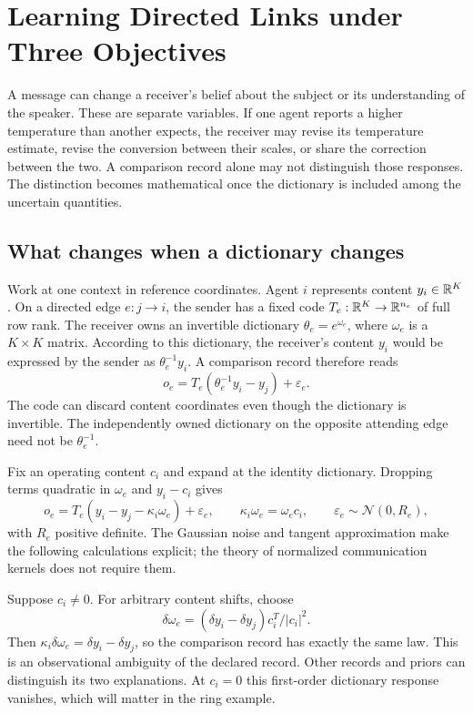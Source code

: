 \chapter{Learning Directed Links under Three Objectives}
\label{c18:link-dynamics}

A message can change a receiver's belief about the subject or its understanding of the speaker. These are separate variables. If one agent reports a higher temperature than another expects, the receiver may revise its temperature estimate, revise the conversion between their scales, or share the correction between the two. A comparison record alone may not distinguish those responses. The distinction becomes mathematical once the dictionary is included among the uncertain quantities.

\section{What changes when a dictionary changes}

Work at one context in reference coordinates. Agent $i$ represents content $y_i\in\mathbb R^K$. On a directed edge $e:j\to i$, the sender has a fixed code $T_e:\mathbb R^K\to\mathbb R^{n_e}$ of full row rank. The receiver owns an invertible dictionary $\theta_e=e^{\omega_e}$, where $\omega_e$ is a $K\times K$ matrix. According to this dictionary, the receiver's content $y_i$ would be expressed by the sender as $\theta_e^{-1}y_i$. A comparison record therefore reads
\begin{equation}
 o_e=T_e(\theta_e^{-1}y_i-y_j)+\varepsilon_e.
 \label{c18:nonlinear-record}
\end{equation}
The code can discard content coordinates even though the dictionary is invertible. The independently owned dictionary on the opposite attending edge need not be $\theta_e^{-1}$.

Fix an operating content $c_i$ and expand at the identity dictionary. Dropping terms quadratic in $\omega_e$ and $y_i-c_i$ gives
\begin{equation}
 o_e=T_e(y_i-y_j-\kappa_i\omega_e)+\varepsilon_e,
 \qquad \kappa_i\omega_e=\omega_ec_i,
 \qquad \varepsilon_e\sim\mathcal N(0,R_e),
 \label{c18:tangent-record}
\end{equation}
with $R_e$ positive definite. The Gaussian noise and tangent approximation make the following calculations explicit; the theory of normalized communication kernels does not require them.

Suppose $c_i\neq0$. For arbitrary content shifts, choose
\begin{equation}
 \delta\omega_e=(\delta y_i-\delta y_j)c_i^T/|c_i|^2.
 \label{c18:compensation}
\end{equation}
Then $\kappa_i\delta\omega_e=\delta y_i-\delta y_j$, so the comparison record has exactly the same law. This is an observational ambiguity of the declared record. Other records and priors can distinguish its two explanations. At $c_i=0$ this first-order dictionary response vanishes, which will matter in the ring example.

